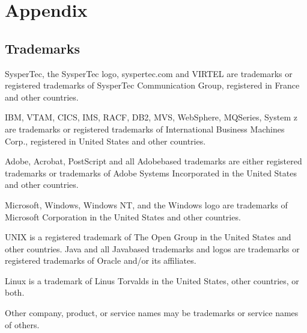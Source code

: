 \documentclass[letterpaper,10pt,english]{sphinxmanual}
\begin{document}
\chapter{Appendix}
\label{\detokenize{connectivity_guide:appendix}}

\section{Trademarks}
\label{\detokenize{connectivity_guide:trademarks}}
\sphinxAtStartPar
SysperTec, the SysperTec logo, syspertec.com and VIRTEL are trademarks or registered trademarks of SysperTec
Communication Group, registered in France and other countries.

\sphinxAtStartPar
IBM, VTAM, CICS, IMS, RACF, DB2, MVS, WebSphere, MQSeries, System z are trademarks or registered trademarks of
International Business Machines Corp., registered in United States and other countries.

\sphinxAtStartPar
Adobe, Acrobat, PostScript and all Adobe\sphinxhyphen{}based trademarks are either registered trademarks or trademarks of Adobe
Systems Incorporated in the United States and other countries.

\sphinxAtStartPar
Microsoft, Windows, Windows NT, and the Windows logo are trademarks of Microsoft Corporation in the United States
and other countries.

\sphinxAtStartPar
UNIX is a registered trademark of The Open Group in the United States and other countries.
Java and all Java\sphinxhyphen{}based trademarks and logos are trademarks or registered trademarks of Oracle and/or its affiliates.

\sphinxAtStartPar
Linux is a trademark of Linus Torvalds in the United States, other countries, or both.

\sphinxAtStartPar
Other company, product, or service names may be trademarks or service names of others.



\renewcommand{\indexname}{Index}
\printindex
\end{document}
